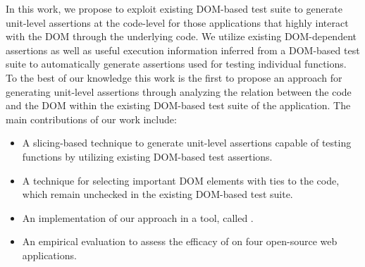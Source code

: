 In this work, we propose to exploit existing DOM-based test suite to generate unit-level assertions at the \javascript code-level for those applications that highly interact with the DOM through the underlying \javascript code. We utilize
existing DOM-dependent assertions as well as useful execution information inferred from a DOM-based test suite to automatically generate assertions used for testing individual \javascript functions. To the best of our knowledge this work is the first to propose an approach for generating unit-level assertions through analyzing the relation between the \javascript code and the DOM within the existing DOM-based test suite of the application. The main contributions of our work include:
\begin{itemize}[noitemsep]
\item A slicing-based technique to generate unit-level assertions capable of testing \javascript functions by utilizing existing DOM-based test assertions.
\item A technique for selecting important DOM elements with ties to the \javascript code, which remain unchecked in the existing DOM-based test suite.
\item An implementation of our approach in a tool, called \tool. 
\item An empirical evaluation to assess the efficacy of \tool on four open-source web applications.
\end{itemize}
    






